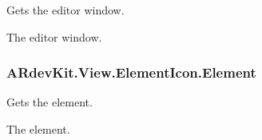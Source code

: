 Gets the editor window. 

The editor window. \hypertarget{class_a_rdev_kit_1_1_view_1_1_element_icon_a5d4cda78ae958d4acc7be292e6c0d99e}{
\subsubsection[{Element}]{ A\-Rdev\-Kit.\-View.\-Element\-Icon.\-Element\hspace{0.3cm}{\ttfamily [get]}}}\label{class_a_rdev_kit_1_1_view_1_1_element_icon_a5d4cda78ae958d4acc7be292e6c0d99e}


Gets the element. 

The element. 